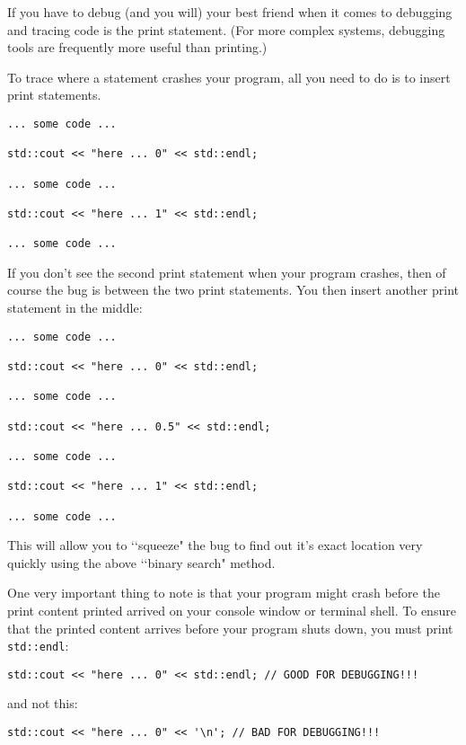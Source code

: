 If you have to debug (and you will) your best friend when it comes to debugging 
and tracing code is the print statement. (For more complex systems, debugging tools 
are frequently more useful than printing.)

To trace where a statement crashes your program, all you need to do is to insert 
print statements. 
\begin{Verbatim}[frame=single,fontsize=\small]
... some code ...

std::cout << "here ... 0" << std::endl;

... some code ...

std::cout << "here ... 1" << std::endl;

... some code ...
\end{Verbatim}

If you don't see the second print statement when your program crashes, then of 
course the bug is between the two print statements. You then insert another print 
statement in the middle:
\begin{Verbatim}[frame=single,fontsize=\small]
... some code ...

std::cout << "here ... 0" << std::endl;

... some code ...

std::cout << "here ... 0.5" << std::endl;

... some code ...

std::cout << "here ... 1" << std::endl;

... some code ...
\end{Verbatim}

This will allow you to \lq\lq squeeze" the bug to find out it's exact location 
very quickly using the above \lq\lq binary search" method.

One very important thing to note is that your program might crash before the 
print content printed arrived on your console window or terminal shell. To 
ensure that the printed content arrives before your program shuts down, you 
must print \verb!std::endl!:
\begin{Verbatim}[frame=single,fontsize=\small]
std::cout << "here ... 0" << std::endl; // GOOD FOR DEBUGGING!!!
\end{Verbatim}

and not this:
\begin{Verbatim}[frame=single,fontsize=\small]
std::cout << "here ... 0" << '\n'; // BAD FOR DEBUGGING!!!
\end{Verbatim}


